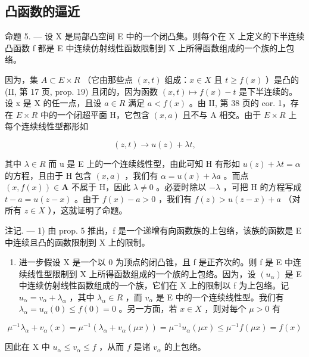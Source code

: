 \subsection{凸函数的逼近}

命题 5. --- 设 X 是局部凸空间 E 中的一个闭凸集。则每个在 X 上定义的下半连续凸函数 f 都是 E 中连续仿射线性函数限制到 X 上所得函数组成的一个族的上包络。

因为，集 \(A \subset E \times R\) （它由那些点 \((x, t)\) 组成：\(x \in X\) 且 \(t \geqslant f(x)\) ）是凸的 (II, 第 17 页, prop. 19) 且闭的，因为函数 \((x, t) \mapsto f(x) - t\) 是下半连续的。设 x 是 X 的任一点，且设 \(a \in R\) 满足 \(a < f(x)\) 。由 II, 第 38 页的 cor. 1，存在 \(E \times R\) 中的一个闭超平面 H，它包含 \((x, a)\) 且不与 A 相交。由于 \(E \times R\) 上每个连续线性型都形如

\[
(z, t) \rightarrow u (z) + \lambda t,
\]

其中 \(\lambda\in R\) 而 u 是 E 上的一个连续线性型，由此可知 H 有形如 \(u(z)+\lambda t=\alpha\) 的方程，且由于 H 包含 \((x,a)\) ，我们有 \(\alpha=u(x)+\lambda a\) 。而点 \((x,f(x))\in\mathbf{A}\) 不属于 H，因此 \(\lambda\neq0\) 。必要时除以 \(-\lambda\) ，可把 H 的方程写成 \(t-a=u(z-x)\) 。由于 \(f(x)-a>0\) ，我们有 \(f(z)>u(z-x)+a\) （对所有 \(z\in X\) ），这就证明了命题。

注记. --- 1) 由 prop. 5 推出，f 是一个递增有向函数族的上包络，该族的函数是 E 中连续且凸的函数限制到 X 上的限制。

\begin{enumerate}
\def\labelenumi{\arabic{enumi})}
\setcounter{enumi}{1}
\tightlist
\item
  进一步假设 X 是一个以 0 为顶点的闭凸锥，且 f 是正齐次的。则 f 是 E 中连续线性型限制到 X 上所得函数组成的一个族的上包络。因为，设 \((u_{\alpha})\) 是 E 中连续仿射线性函数组成的一个族，它们在 X 上的限制以 f 为上包络。记 \(u_{\alpha} = v_{\alpha} + \lambda_{\alpha}\) ，其中 \(\lambda_{\alpha} \in R\) ，而 \(v_{\alpha}\) 是 E 中的一个连续线性型。我们有 \(\lambda_{\alpha} = u_{\alpha}(0) \leqslant f(0) = 0\) 。另一方面，若 \(x \in X\) ，则对每个 \(\mu > 0\) 有
\end{enumerate}

\[
\mu^ {- 1} \lambda_ {\alpha} + v _ {\alpha} (x) = \mu^ {- 1} (\lambda_ {\alpha} + v _ {\alpha} (\mu x)) = \mu^ {- 1} u _ {\alpha} (\mu x) \leqslant \mu^ {- 1} f (\mu x) = f (x)
\]

因此在 X 中 \(u_{\alpha} \leqslant v_{\alpha} \leqslant f\) ，从而 \(f\) 是诸 \(v_{\alpha}\) 的上包络。

